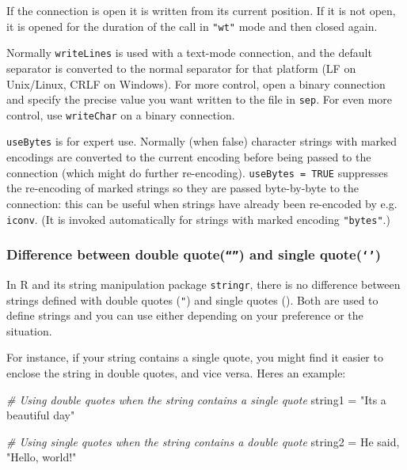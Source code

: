 \documentclass[
]{article}
\newenvironment{Shaded}{}{}
\newcommand{\CommentTok}[1]{\textcolor[rgb]{0.38,0.63,0.69}{\textit{#1}}}
\newcommand{\NormalTok}[1]{#1}
\newcommand{\OtherTok}[1]{\textcolor[rgb]{0.00,0.44,0.13}{#1}}
\newcommand{\StringTok}[1]{\textcolor[rgb]{0.25,0.44,0.63}{#1}}
\begin{document}
If the connection is open it is written from its current position. If it
is not open, it is opened for the duration of the call in \texttt{"wt"}
mode and then closed again.

Normally \texttt{writeLines} is used with a text-mode connection, and
the default separator is converted to the normal separator for that
platform (LF on Unix/Linux, CRLF on Windows). For more control, open a
binary connection and specify the precise value you want written to the
file in \texttt{sep}. For even more control, use \texttt{writeChar} on a
binary connection.

\texttt{useBytes} is for expert use. Normally (when false) character
strings with marked encodings are converted to the current encoding
before being passed to the connection (which might do further
re-encoding). \texttt{useBytes\ =\ TRUE} suppresses the re-encoding of
marked strings so they are passed byte-by-byte to the connection: this
can be useful when strings have already been re-encoded by e.g.
\texttt{iconv}. (It is invoked automatically for strings with marked
encoding \texttt{"bytes"}.)

\hypertarget{difference-between-double-quote-and-single-quote}{%
\subsubsection{\texorpdfstring{Difference between double
quote(\texttt{“”}) and single
quote(\texttt{‘’})}{Difference between double quote(``\,'') and single quote(`\,')}}\label{difference-between-double-quote-and-single-quote}}

In R and its string manipulation package \texttt{stringr}, there is no
difference between strings defined with double quotes (\texttt{"}) and
single quotes (\texttt{\textquotesingle{}}). Both are used to define
strings and you can use either depending on your preference or the
situation.

For instance, if your string contains a single quote, you might find it
easier to enclose the string in double quotes, and vice versa.
Here\textquotesingle s an example:

\begin{Shaded}
\begin{Highlighting}[]
\CommentTok{\# Using double quotes when the string contains a single quote}
\NormalTok{string1 }\OtherTok{=} \StringTok{"It\textquotesingle{}s a beautiful day"}

\CommentTok{\# Using single quotes when the string contains a double quote}
\NormalTok{string2 }\OtherTok{=} \StringTok{\textquotesingle{}He said, "Hello, world!"\textquotesingle{}}
\end{Highlighting}
\end{Shaded}
\end{document}
